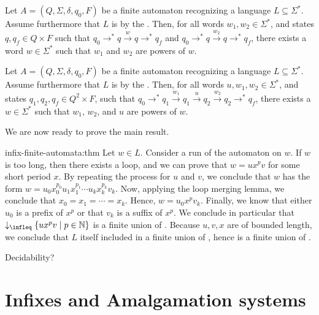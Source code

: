 \begin{lemma}
    Let $A = (Q, \Sigma, \delta, q_0, F)$ be a finite automaton recognizing a
    language $L \subseteq \Sigma^*$. Assume furthermore that
    $L$ is  by the .
    Then, for all words $w_1, w_2 \in \Sigma^*$, and states
    $q, q_f \in Q \times F$ such that
    $q_0 \rightarrow^* q \xrightarrow{w} q \rightarrow^* q_f$
    and 
    $q_0 \rightarrow^* q \xrightarrow{w_2} q \rightarrow^* q_f$,
    there exists a word $w \in \Sigma^*$
    such that $w_1$ and $w_2$ are powers of $w$.
\end{lemma}

\begin{lemma}
    Let $A = (Q, \Sigma, \delta, q_0, F)$ be a finite automaton recognizing a
    language $L \subseteq \Sigma^*$. Assume furthermore that
    $L$ is  by the .
    Then, for all words $u, w_1, w_2 \in \Sigma^*$, and states
    $q_1, q_2, q_f \in Q^2 \times F$,
    such that
    $q_0 \rightarrow^* q_1 \xrightarrow{w_1} q_1 \xrightarrow{u} q_2 \xrightarrow{w_2} q_2
    \rightarrow^* q_f$,
    there exists a $w \in \Sigma^*$ such that $w_1$, $w_2$, and $u$ are powers of $w$.
\end{lemma}

We are now ready to prove the main result.

\begin{proofof}{infix-finite-automata:thm}
    Let $w \in L$. Consider a run of the automaton on $w$. If $w$ is too long,
    then there exists a loop, and we can prove that $w = u x^p v$ for some
    short period $x$. By repeating the process for $u$ and $v$, we conclude
    that $w$ has the form $w = u_0 x_0^{p_0} u_1 x_1^{p_1} \cdots u_k x_k^{p_k}
    v_k$. Now, applying the loop merging lemma, we conclude that $x_0 = x_1 =
    \cdots = x_k$. Hence, $w = u_0 x^{p} v_k$. Finally, we know that either
    $u_0$ is a prefix of $x^{p}$ or that $v_k$ is a suffix of $x^{p}$. We
    conclude in particular that $\dwset[\infleq]{ \setof{ u x^p v }{ p \in \Nat
    }}$ is a finite union of . Because $u,v,x$ are of bounded
    length, we conclude that $L$ itself included in a finite union of
    , hence is a finite union of .
\end{proofof}

\begin{corollary}
    Decidability?
\end{corollary}

\section{Infixes and Amalgamation systems}
\label{infixes-amalgamation:sec}


